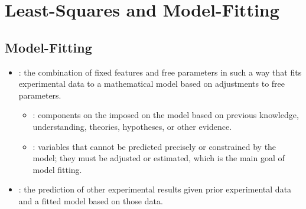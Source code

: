 \chapter{Least-Squares and Model-Fitting}\label{Least-Squares and Model-Fitting}

\section{Model-Fitting}\label{Outline of Model-Fitting}
\begin{itemize}
  \item {}: the combination of fixed features and free parameters in such a way that fits experimental data to a mathematical model based on adjustments to free parameters. 
    \begin{itemize}
      \item {}: components on the imposed on the model based on previous knowledge, understanding, theories, hypotheses, or other evidence. 
      \item {}: variables that cannot be predicted precisely or constrained by the model; they must be adjusted or estimated, which is the main goal of model fitting.
    \end{itemize}
  \item {}: the prediction of other experimental results given prior experimental data and a fitted model based on those data.
  

\end{itemize}
